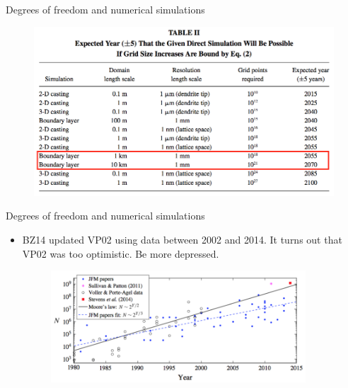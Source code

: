 
\begin{frame}{Degrees of freedom and numerical simulations}
	\begin{figure}
		\includegraphics[width=1\textwidth]{mooreslaw2.png}
	\end{figure}
\end{frame}


\begin{frame}{Degrees of freedom and numerical simulations}

\begin{itemize}
	\item BZ14 updated VP02 using data between 2002 and 2014. It turns out that VP02 was too optimistic. Be more depressed.
	\begin{figure}
		\includegraphics[width=0.9\textwidth]{mooreslaw3.png}
	\end{figure}
\end{itemize}
\end{frame}


